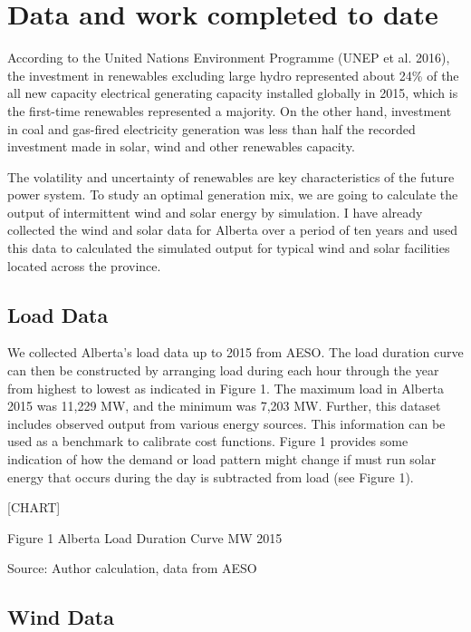 \section{Data and work completed to
date}\label{data-and-work-completed-to-date}

According to the United Nations Environment Programme (UNEP et al.
2016), the investment in renewables excluding large hydro represented
about 24\% of the all new capacity electrical generating capacity
installed globally in 2015, which is the first-time renewables
represented a majority. On the other hand, investment in coal and
gas-fired electricity generation was less than half the recorded
investment made in solar, wind and other renewables capacity.

The volatility and uncertainty of renewables are key characteristics of
the future power system. To study an optimal generation mix, we are
going to calculate the output of intermittent wind and solar energy by
simulation. I have already collected the wind and solar data for Alberta
over a period of ten years and used this data to calculated the
simulated output for typical wind and solar facilities located across
the province.

\subsection{Load Data}\label{load-data}

We collected Alberta's load data up to 2015 from AESO. The load duration
curve can then be constructed by arranging load during each hour through
the year from highest to lowest as indicated in Figure 1. The maximum
load in Alberta 2015 was 11,229 MW, and the minimum was 7,203 MW.
Further, this dataset includes observed output from various energy
sources. This information can be used as a benchmark to calibrate cost
functions. Figure 1 provides some indication of how the demand or load
pattern might change if must run solar energy that occurs during the day
is subtracted from load (see Figure 1).

{{[}CHART{]}}

Figure 1 Alberta Load Duration Curve MW 2015

Source: Author calculation, data from AESO

\subsection{Wind Data}\label{wind-data}

